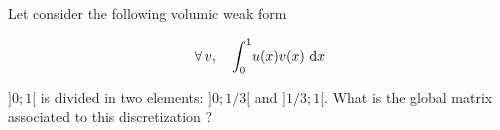\bexo

Let consider the following volumic weak form

\begin{equation}
	\forall \,v, \quad  \displaystyle{\int_0^1} u(x)v(x) \,\,\textrm{d} x 
\end{equation}

$]0;1[$ is divided in two elements: $]0;1/3[$ and $]1/3;1[$. What is the global matrix associated to this discretization ?

\eexo

\solution{

}